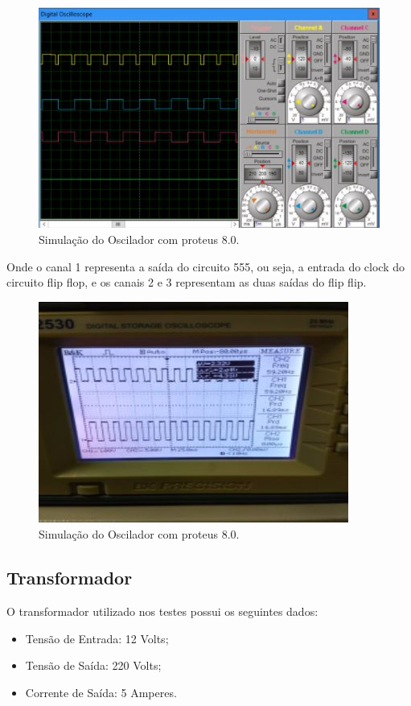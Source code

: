 \begin{figure}[H]
	\begin{center}
		\includegraphics[scale = 0.75]{figuras/Simulacao_FlipFlop}
		\caption{ Simulação do Oscilador com proteus 8.0.}
	\end{center}
\end{figure}

Onde o canal 1 representa a saída do circuito 555, ou seja, a entrada do clock do circuito flip flop, e os canais 2 e 3 representam as duas saídas do flip flip.
\begin{figure}[H]
	\begin{center}
		\includegraphics[scale = 0.75]{figuras/FlipFlop}
		\caption{ Simulação do Oscilador com proteus 8.0.}
	\end{center}
\end{figure}

\subsection{Transformador}
O transformador utilizado nos testes possui os seguintes dados:
\begin{itemize}
	\item Tensão de Entrada: 12 Volts;
	\item Tensão de Saída: 220 Volts;
	\item Corrente de Saída: 5 Amperes.
	\end{itemize}
	

